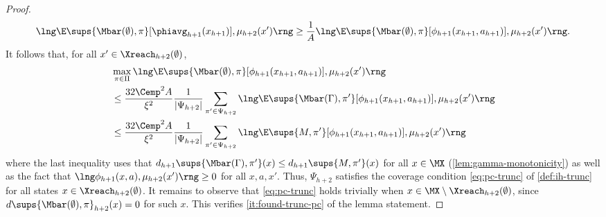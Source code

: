 \documentclass[11pt, oneside]{article}
\theoremstyle{plain}
\theoremstyle{definition}
\numberwithin{theorem}{section}
\renewcommand{\^}[1]{^{(#1)}}
\begin{document}
\begin{proof}
\[\lng \E\sups{\Mbar(\emptyset), \pi}[ \phiavg_{h+1}(x_{h+1})], \mu_{h+2}(x')\rng \geq \frac{1}{A} \lng \E\sups{\Mbar(\emptyset), \pi}[\phi_{h+1}(x_{h+1},a_{h+1})], \mu_{h+2}(x')\rng.\]
It follows that, for all $x' \in \Xreach_{h+2}(\emptyset)$, 
\begin{align}
  &\max_{\pi \in \Pi} \lng \E\sups{\Mbar(\emptyset), \pi}[\phi_{h+1}(x_{h+1},a_{h+1})], \mu_{h+2}(x')\rng \nonumber\\
  &\leq \frac{32\Cemp^2 A}{\xi^2} \frac{1}{|\Psi_{h+2}|}\sum_{\pi' \in \Psi_{h+2}} \lng \E\sups{\Mbar(\Gamma), \pi'}[\phi_{h+1}(x_{h+1},a_{h+1})], \mu_{h+2}(x') \rng \nonumber\\
  &\leq \frac{32\Cemp^2 A}{\xi^2} \frac{1}{|\Psi_{h+2}|}\sum_{\pi' \in \Psi_{h+2}} \lng \E\sups{M, \pi'}[\phi_{h+1}(x_{h+1},a_{h+1})], \mu_{h+2}(x') \rng \nonumber
\end{align}
where the last inequality uses that $d_{h+1}\sups{\Mbar(\Gamma),\pi'}(x) \leq d_{h+1}\sups{M,\pi'}(x)$ for all $x\in\MX$ (\cref{lem:gamma-monotonicity}) as well as the fact that $\lng \phi_{h+1}(x,a), \mu_{h+2}(x') \rng \geq 0$ for all $x,a,x'$. Thus, $\Psi_{h+2}$ satisfies the coverage condition \cref{eq:pc-trunc} of \cref{def:ih-trunc} for all states $x \in \Xreach_{h+2}(\emptyset)$. It remains to observe that \cref{eq:pc-trunc} holds trivially when $x \in \MX \setminus \Xreach_{h+2}(\emptyset)$, since $d\sups{\Mbar(\emptyset),\pi}_{h+2}(x) = 0$ for such $x$. This verifies \cref{it:found-trunc-pc} of the lemma statement.
\end{proof}
\end{document}
